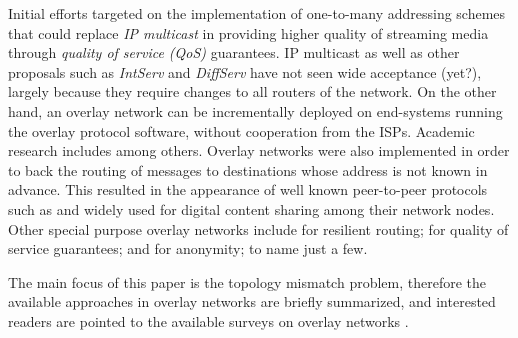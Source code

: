 \documentclass[acmcsur]{acmtrans2m}
\begin{document}
Initial efforts targeted on the implementation of one-to-many addressing schemes
that could replace \emph{IP multicast} in providing higher quality of streaming
media through \emph{quality of service (QoS)} guarantees. IP multicast as well
as other proposals such as \emph{IntServ} and \emph{DiffServ}
\cite{cisco_diffserv_2005} have not seen wide acceptance (yet?), largely because
they require changes to all routers of the network. On the other hand, an
overlay network can be incrementally deployed on end-systems running the overlay
protocol software, without cooperation from the ISPs. Academic research includes
\cite{chu_esm_2000,jannotti_overcast_2000,kwon_tag_2002} among others.  Overlay
networks were also implemented in order to back the routing of messages to
destinations whose address is not known in advance. This resulted in the
appearance of well known peer-to-peer protocols such as \cite{gnutella} and
\cite{maymounkov_kademlia_2002} widely used for digital content sharing among
their network nodes.  Other special purpose overlay networks include
\cite{anderson_ron_2001} for resilient routing; \cite{subramanian_overqos_2004}
for quality of service guarantees; and \cite{clarke_freenet_2001} for anonymity;
to name just a few.

The main focus of this paper is the topology mismatch problem, therefore the
available approaches in overlay networks are briefly summarized, and interested
readers are pointed to the available surveys on overlay networks
\cite{TheotokisS04,LuaCPSL05}.
\end{document}
